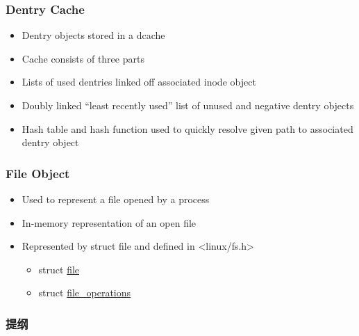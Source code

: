 \begin{frame}[fragile]
    \frametitle{Dentry Cache}

    \begin{itemize}
        \item Dentry objects stored in a dcache
        \item Cache consists of three parts
        \item Lists of used dentries linked off associated inode object
        \item Doubly linked “least recently used” list of unused and negative dentry objects
        \item Hash table and hash function used to quickly resolve given path to associated dentry object
    \end{itemize}
% 
\end{frame}
\begin{frame}[fragile]
    \frametitle{File Object}


    \begin{itemize}
        \item Used to represent a file opened by a process
        \item In-memory representation of an open file
        \item Represented by struct file and defined in <linux/fs.h>
	    \begin{itemize}
	        \item struct \href{https://elixir.bootlin.com/linux/latest/source/include/linux/fs.h\#L965}{file}
          \item struct \href{https://elixir.bootlin.com/linux/latest/source/include/linux/fs.h\#L2071}{file\_operations}
      \end{itemize}
    \end{itemize}
% 
\end{frame}
\begin{frame}
\frametitle{提纲} %
\tableofcontents %
\end{frame}
